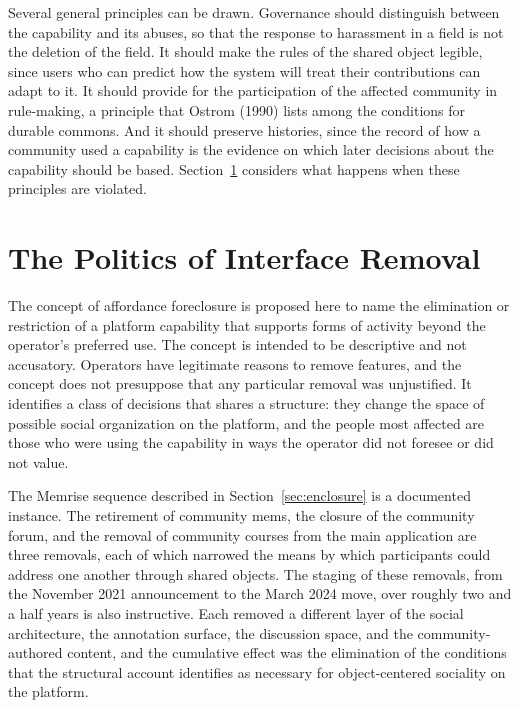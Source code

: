 \documentclass[11pt]{article}
\theoremstyle{remark}
\begin{document}
Several general principles can be drawn. Governance should distinguish between the capability and its abuses, so that the response to harassment in a field is not the deletion of the field. It should make the rules of the shared object legible, since users who can predict how the system will treat their contributions can adapt to it. It should provide for the participation of the affected community in rule-making, a principle that Ostrom (1990) lists among the conditions for durable commons. And it should preserve histories, since the record of how a community used a capability is the evidence on which later decisions about the capability should be based. Section~\ref{sec:foreclosure} considers what happens when these principles are violated.

\section{The Politics of Interface Removal}
\label{sec:foreclosure}

The concept of affordance foreclosure is proposed here to name the elimination or restriction of a platform capability that supports forms of activity beyond the operator's preferred use. The concept is intended to be descriptive and not accusatory. Operators have legitimate reasons to remove features, and the concept does not presuppose that any particular removal was unjustified. It identifies a class of decisions that shares a structure: they change the space of possible social organization on the platform, and the people most affected are those who were using the capability in ways the operator did not foresee or did not value.

The Memrise sequence described in Section~\ref{sec:enclosure} is a documented instance. The retirement of community mems, the closure of the community forum, and the removal of community courses from the main application are three removals, each of which narrowed the means by which participants could address one another through shared objects. The staging of these removals, from the November 2021 announcement to the March 2024 move, over roughly two and a half years is also instructive. Each removed a different layer of the social architecture, the annotation surface, the discussion space, and the community-authored content, and the cumulative effect was the elimination of the conditions that the structural account identifies as necessary for object-centered sociality on the platform.
\end{document}

